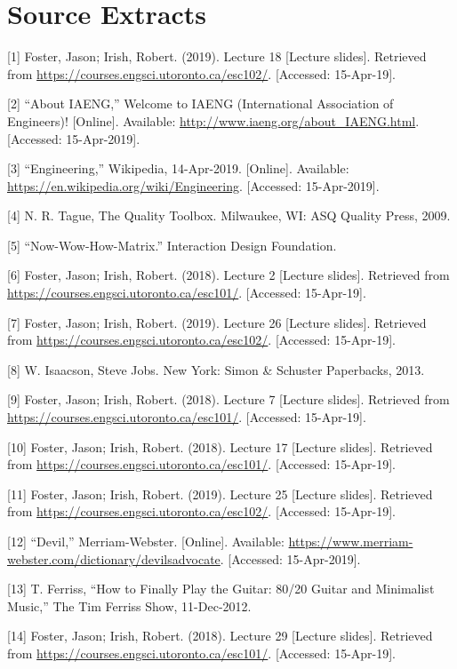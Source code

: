 \documentclass[a4paper,12pt]{article}
\begin{document}
\section{Source Extracts}
[1] Foster, Jason; Irish, Robert. (2019). Lecture 18 [Lecture slides]. Retrieved from \url{https://courses.engsci.utoronto.ca/esc102/}. [Accessed: 15-Apr-19].

[2] “About IAENG,” Welcome to IAENG (International Association of Engineers)! [Online]. Available: \url{http://www.iaeng.org/about_IAENG.html}. [Accessed: 15-Apr-2019].

[3] “Engineering,” Wikipedia, 14-Apr-2019. [Online]. Available: \url{https://en.wikipedia.org/wiki/Engineering}. [Accessed: 15-Apr-2019].

[4] N. R. Tague, The Quality Toolbox. Milwaukee, WI: ASQ Quality Press, 2009.

[5] “Now-Wow-How-Matrix.” Interaction Design Foundation.

[6] Foster, Jason; Irish, Robert. (2018). Lecture 2 [Lecture slides]. Retrieved from \url{https://courses.engsci.utoronto.ca/esc101/}. [Accessed: 15-Apr-19].

[7] Foster, Jason; Irish, Robert. (2019). Lecture 26 [Lecture slides]. Retrieved from \url{https://courses.engsci.utoronto.ca/esc102/}. [Accessed: 15-Apr-19].

[8] W. Isaacson, Steve Jobs. New York: Simon \& Schuster Paperbacks, 2013.

[9] Foster, Jason; Irish, Robert. (2018). Lecture 7 [Lecture slides]. Retrieved from \url{https://courses.engsci.utoronto.ca/esc101/}. [Accessed: 15-Apr-19].

[10] Foster, Jason; Irish, Robert. (2018). Lecture 17 [Lecture slides]. Retrieved from \url{https://courses.engsci.utoronto.ca/esc101/}. [Accessed: 15-Apr-19].

[11] Foster, Jason; Irish, Robert. (2019). Lecture 25 [Lecture slides]. Retrieved from \url{https://courses.engsci.utoronto.ca/esc102/}. [Accessed: 15-Apr-19].

[12] “Devil,” Merriam-Webster. [Online]. Available: \url{https://www.merriam-webster.com/dictionary/devilsadvocate}. [Accessed: 15-Apr-2019].

[13] T. Ferriss, “How to Finally Play the Guitar: 80/20 Guitar and Minimalist Music,” The Tim Ferriss Show, 11-Dec-2012.

[14] Foster, Jason; Irish, Robert. (2018). Lecture 29 [Lecture slides]. Retrieved from \url{https://courses.engsci.utoronto.ca/esc101/}. [Accessed: 15-Apr-19].
\end{document}
